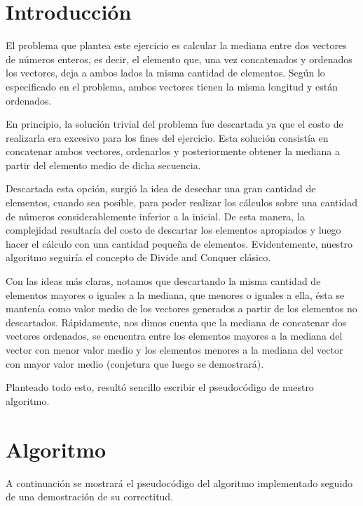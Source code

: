 \documentclass[a4paper,10pt] {article}
\begin{document}
\bigskip
\section*{Introducci\'on}

El problema que plantea este ejercicio es calcular la mediana entre dos vectores de n\'umeros enteros, es decir, el elemento que, una vez concatenados y ordenados los vectores, deja a ambos lados la misma cantidad de elementos. Seg\'un lo especificado en el problema, ambos vectores tienen la misma longitud y est\'an ordenados.

En principio, la soluci\'on trivial del problema fue descartada ya que el costo de realizarla era excesivo para los fines del ejercicio. Esta soluci\'on consist\'ia en concatenar ambos vectores, ordenarlos y posteriormente obtener la mediana a partir del elemento medio de dicha secuencia.

Descartada esta opci\'on, surgi\'o la idea de desechar una gran cantidad de elementos, cuando sea posible, para poder realizar los c\'alculos sobre una cantidad de n\'umeros considerablemente inferior a la inicial. De esta manera, la complejidad resultar\'ia del costo de descartar los elementos apropiados y luego hacer el c\'alculo con una cantidad peque\~{n}a de elementos. Evidentemente, nuestro algoritmo seguir\'ia el concepto de Divide and Conquer cl\'asico.

Con las ideas m\'as claras, notamos que descartando la misma cantidad de elementos mayores o iguales a la mediana, que menores o iguales a ella, \'esta se manten\'ia como valor medio de los vectores generados a partir de los elementos no descartados. R\'apidamente, nos dimos cuenta que la mediana de concatenar dos vectores ordenados, se encuentra entre los elementos mayores a la mediana del vector con menor valor medio y los elementos menores a la mediana del vector con mayor valor medio (conjetura que luego se demostrar\'a).

Planteado todo esto, result\'o sencillo escribir el pseudoc\'odigo de nuestro algoritmo. 

\section*{Algoritmo}

A continuaci\'on se mostrar\'a el pseudoc\'odigo del algoritmo implementado seguido de una demostraci\'on de su correctitud.
\end{document}
